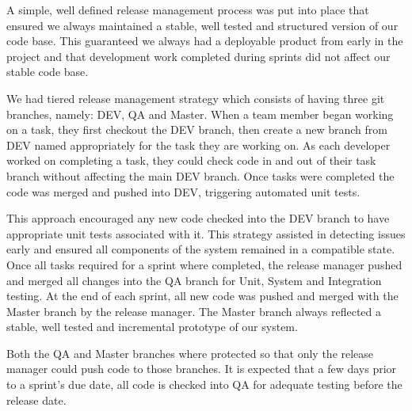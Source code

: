 \documentclass[a4paper,11pt]{article}
\begin{document}
A simple, well defined release management process was put into place that ensured we always maintained a stable, well tested and structured version of our code base. This guaranteed we always had a deployable product from early in the project and that development work completed during sprints did not affect our stable code base.

We had tiered release management strategy which consists of having three git branches, namely: DEV, QA and Master. When a team member began working on a task, they first checkout the DEV branch, then create a new branch from DEV named appropriately for the task they are working on. As each developer worked on completing a task, they could check code in and out of their task branch without affecting the main DEV branch. Once tasks were completed the code was merged and pushed into DEV, triggering automated unit tests.

This approach encouraged any new code checked into the DEV branch to have appropriate unit tests associated with it. This strategy assisted in detecting issues early and ensured all components of the system remained in a compatible state. Once all tasks required for a sprint where completed, the release manager pushed and merged all changes into the QA branch for Unit, System and Integration testing. At the end of each sprint, all new code was pushed and merged with the Master branch by the release manager. The Master branch always reflected a stable, well tested and incremental prototype of our system. 

Both the QA and Master branches where protected so that only the release manager could push code to those branches. It is expected that a few days prior to a sprint’s due date, all code is checked into QA for adequate testing before the release date. 
\end{document}
